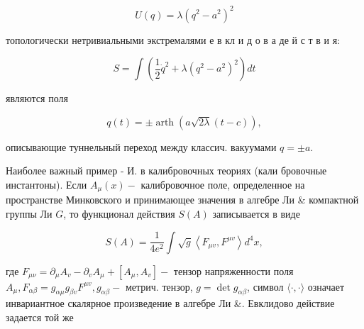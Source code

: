 \documentclass[10pt]{article}
\begin{document}
\[

U(q)=\lambda\left(q^{2}-a^{2}\right)^{2}

\]



топологически нетривиальными экстремалями е в кл и д о в а де й с т в и я:



\[

S=\int\left(\frac{1}{2} \dot{q}^{2}+\lambda\left(q^{2}-a^{2}\right)^{2}\right) d t

\]



являются поля



\[

q(t)= \pm \operatorname{arth}(a \sqrt{2 \lambda}(t-c)),

\]



описывающие туннельный переход между классич. вакуумами $q= \pm a$.



Наиболее важный пример - И. в калибровочных теориях (кали бровочные инстантоны). Если $A_{\mu}(x)-$ калибровочное поле, определенное на пространстве Минковского и принимающее значения в алгебре Ли \& компактной группы Ли $G$, то функционал действия $S(A)$ записывается в виде



\[

S(A)=\frac{1}{4 e^{2}} \int \sqrt{g}\left\langle F_{\mu v}, F^{\mu v}\right\rangle d^{4} x,

\]



где $F_{\mu \nu}=\partial_{\mu} A_{v}-\partial_{v} A_{\mu}+\left[A_{\mu}, A_{v}\right]-$ тензор напряженности поля $A_{\mu}, F_{\alpha \beta}=g_{\alpha \mu} g_{\beta v} F^{\mu v}, g_{\alpha \beta}-$ метрич. тензор, $g=\operatorname{det} g_{\alpha \beta}$, символ $\langle\cdot, \cdot\rangle$ означает инвариантное скалярное произведение в алгебре Ли \&. Евклидово действие задается той же
\end{document}
